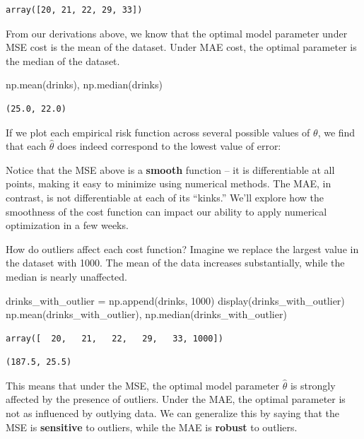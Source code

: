 \documentclass[
  letterpaper,
  DIV=11,
  numbers=noendperiod]{scrreprt}
\newenvironment{Shaded}{\begin{snugshade}}{\end{snugshade}}
\newcommand{\DecValTok}[1]{\textcolor[rgb]{0.68,0.00,0.00}{#1}}
\newcommand{\NormalTok}[1]{\textcolor[rgb]{0.00,0.23,0.31}{#1}}
\newcommand{\OperatorTok}[1]{\textcolor[rgb]{0.37,0.37,0.37}{#1}}
\begin{document}
\begin{verbatim}
array([20, 21, 22, 29, 33])
\end{verbatim}

From our derivations above, we know that the optimal model parameter
under MSE cost is the mean of the dataset. Under MAE cost, the optimal
parameter is the median of the dataset.

\begin{Shaded}
\begin{Highlighting}[]
\NormalTok{np.mean(drinks), np.median(drinks)}
\end{Highlighting}
\end{Shaded}

\begin{verbatim}
(25.0, 22.0)
\end{verbatim}

If we plot each empirical risk function across several possible values
of \(\theta\), we find that each \(\hat{\theta}\) does indeed correspond
to the lowest value of error:

Notice that the MSE above is a \textbf{smooth} function -- it is
differentiable at all points, making it easy to minimize using numerical
methods. The MAE, in contrast, is not differentiable at each of its
``kinks.'' We'll explore how the smoothness of the cost function can
impact our ability to apply numerical optimization in a few weeks.

How do outliers affect each cost function? Imagine we replace the
largest value in the dataset with 1000. The mean of the data increases
substantially, while the median is nearly unaffected.

\begin{Shaded}
\begin{Highlighting}[]
\NormalTok{drinks\_with\_outlier }\OperatorTok{=}\NormalTok{ np.append(drinks, }\DecValTok{1000}\NormalTok{)}
\NormalTok{display(drinks\_with\_outlier)}
\NormalTok{np.mean(drinks\_with\_outlier), np.median(drinks\_with\_outlier)}
\end{Highlighting}
\end{Shaded}

\begin{verbatim}
array([  20,   21,   22,   29,   33, 1000])
\end{verbatim}

\begin{verbatim}
(187.5, 25.5)
\end{verbatim}

This means that under the MSE, the optimal model parameter
\(\hat{\theta}\) is strongly affected by the presence of outliers. Under
the MAE, the optimal parameter is not as influenced by outlying data. We
can generalize this by saying that the MSE is \textbf{sensitive} to
outliers, while the MAE is \textbf{robust} to outliers.
\end{document}
